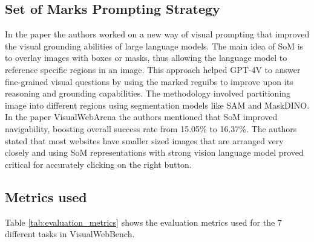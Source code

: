 \documentclass[11pt,a4paper]{article}
\begin{document}
\subsection*{Set of Marks Prompting Strategy}
In the paper \cite{yang2023set} the authors worked on a new way of visual prompting that improved the visual grounding abilities of large language models. The main idea of SoM is to overlay images with boxes or masks, thus allowing the language model to reference specific regions in an image. This approach helped GPT-4V to answer fine-grained visual questions by using the marked reguibs to improve upon its reasoning and grounding capabilities. The methodology involved partitioning image into different regions using segmentation models like SAM and MaskDINO.
In the paper VisualWebArena \cite{koh2024visualwebarena} the authors mentioned that SoM improved navigability, boosting overall success rate from 15.05\% to 16.37\%. The authors stated that most websites have  smaller sized images that are arranged very closely and using SoM representations with strong vision language model proved critical for accurately clicking on the right button.

\subsection{Metrics used}

Table \ref{tab:evaluation_metrics} shows the evaluation metrics used for the 7 different tasks in VisualWebBench.

\begin{table}[H]
\centering
{}  %
\caption{The benchmark uses different metrics for different tasks.}
\label{tab:evaluation_metrics}
\end{table}
\end{document}
